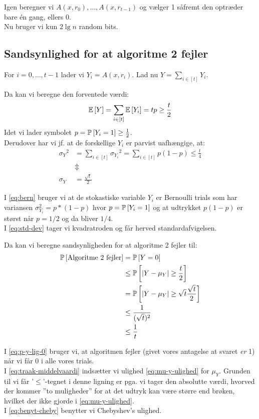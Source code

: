 Igen beregner vi $A(x, r_0), \dots, A(x, r_{t-1})$ og vælger 1 såfremt den optræder bare én gang, ellers 0.\\

Nu bruger vi kun $2 \lg n$ random bits.

\subsection{Sandsynlighed for at algoritme 2 fejler}
For $i = 0, \dots, t-1$ lader vi $Y_i = A(x, r_i)$. Lad nu $Y = \sum_{i \in [t]} Y_i$.

Da kan vi beregne den forventede værdi:
\begin{align}
  \E{Y} = \sum_{i \in [t]} \E{Y_i} = tp \geq \frac{t}{2} \label{eq:mu-y-ulighed}
\end{align}
Idet vi lader symbolet $p = \P{Y_i = 1} \geq \frac{1}{2}$.\\

Derudover har vi jf. at de forskellige $Y_i$ er parvist uafhængige, at:
\begin{align}
  {\sigma_Y}^2
  &= \sum_{i \in [t]} {\sigma_{Y_i}}^2
  = \sum_{i \in [t]} p(1-p)
  \leq \frac{t}{4} \label{eq:bern} \\
  &\Updownarrow \nonumber  \\
  \sigma_Y &= \frac{\sqrt{t}}{2}  \label{eq:std-dev}
\end{align}

I \cref{eq:bern} bruger vi at de stokastiske variable $Y_i$ er Bernoulli trials som har variansen $\sigma_{Y_i}^2 = p*(1-p)$ hvor $p = \P{Y_i = 1}$ og at udtrykket $p(1 - p)$ er størst når $p = 1/2$ og da bliver $1/4$.\\
I \cref{eq:std-dev} tager vi kvadratroden og får herved standardafvigelsen.


Da kan vi beregne sandsynligheden for at algoritme 2 fejler til:
\begin{align}
  \P{\text{Algoritme 2 fejler}} &= \P{Y = 0} \label{eq:p-y-lig-0} \\
  &\leq \P{| Y - \mu_Y| \geq \frac{t}{2}} \label{eq:traak-middelvaardi} \\
  &= \P{|Y - \mu_Y| \geq \sqrt{t} \frac{\sqrt{t}}{2}} \nonumber \\
  &\leq \frac{1}{(\sqrt{t})^2} \label{eq:benyt-cheby}\\
  &\leq \frac{1}{t} \nonumber
\end{align}

I \cref{eq:p-y-lig-0} bruger vi, at algoritmen fejler (givet vores antagelse at svaret \emph{er} 1) når vi får 0 i alle vores trials.\\
I \cref{eq:traak-middelvaardi} indsætter vi ulighed \cref{eq:mu-y-ulighed} for $\mu_Y$. Grunden til vi får '$\leq$'-tegnet i denne ligning er pga. vi tager den absolutte værdi, hvorved der kommer ''to muligheder'' for at det udtryk kan være større end brøken, hvilket der ikke gjorde i \cref{eq:mu-y-ulighed}.\\
I \cref{eq:benyt-cheby} benytter vi Chebyshev's ulighed.\\

